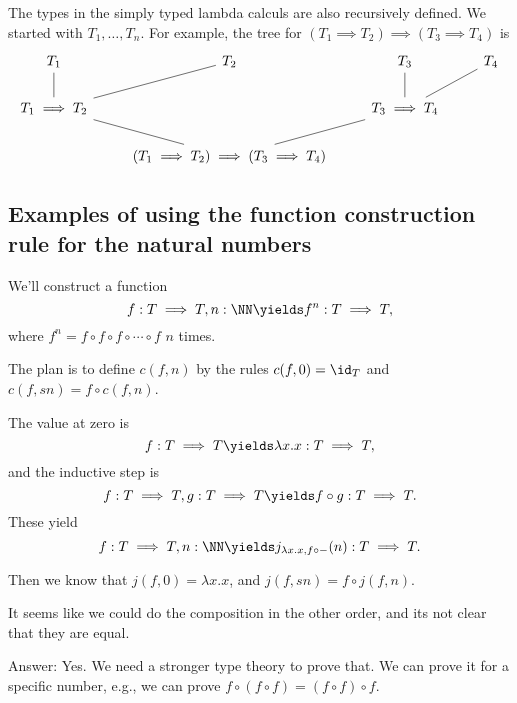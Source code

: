 \documentclass{article}
\begin{document}
The types in the simply typed lambda calculs 
are also recursively defined.
We started with $T_1,\ldots,T_n$.
For example,
the tree for $(T_1\implies T_2)\implies (T_3\implies T_4)$ is
\[
\begin{tikzcd}
T_1 \arrow[d, no head]              & T_2 \arrow[ld, no head]                    & T_3 \arrow[d, no head]              & T_4 \arrow[ld, no head] \\
T_1\implies T_2 \arrow[rd, no head] &                                            & T_3\implies T_4 \arrow[ld, no head] &                         \\
                                    & (T_1\implies T_2)\implies(T_3\implies T_4) &                                     &                        
\end{tikzcd}
    \]

\subsection{Examples of using the function construction rule for 
the natural numbers}

We'll construct a function 
\[ f:T\implies T, n:\NN \yields f^n :T\implies T,\]
where $f^n=f\circ f \circ f \circ \cdots \circ f$ $n$ times.

The plan is to define $c(f,n)$ by the rules 
$c(f,0)=\id_T$ and $c(f,sn) = f\circ c(f,n)$.

The value at zero is 
\[ f:T\implies T \yields 
    \lambda x.x : T\implies T, \]
and the inductive step is 
\[f:T\implies T, g:T\implies T \yields 
        f\circ g : T\implies T.
    \]
These yield
\[ f:T\implies T,n:\NN \yields 
    j_{\lambda x.x,f\circ -}(n) : T\implies T.
    \]

Then we know that $j(f,0)=\lambda x.x$, and 
$j(f,sn) = f\circ j(f,n)$.

\begin{question}
    It seems like we could do the composition in the other 
    order, and its not clear that they are equal.

    Answer: Yes. We need a stronger type theory to prove that.
    We can prove it for a specific number, e.g.,
    we can prove $f\circ (f\circ f) = (f\circ f) \circ f$.
\end{question}
\end{document}
